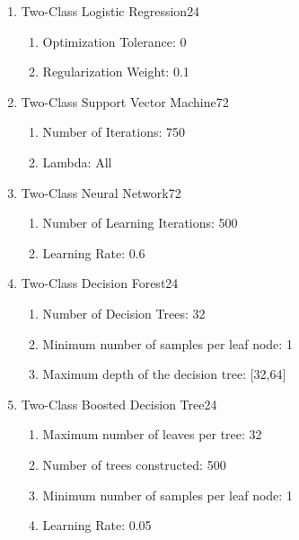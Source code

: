 \begin{enumerate}
    \item{Two-Class Logistic Regression}24
    
    \begin{enumerate}
        \item{Optimization Tolerance:} 0
        \item{Regularization Weight:} 0.1
    \end{enumerate}
    
    \item{Two-Class Support Vector Machine}72
    
    \begin{enumerate}
        \item{Number of Iterations:} 750
        \item{Lambda:} All
    \end{enumerate}
    
    \item{Two-Class Neural Network}72
    
    \begin{enumerate}
        \item{Number of Learning Iterations:} 500
        \item{Learning Rate:} 0.6
    \end{enumerate}
    
    \item{Two-Class Decision Forest}24

    \begin{enumerate}
        \item{Number of Decision Trees:} 32
        \item{Minimum number of samples per leaf node:} 1
        \item{Maximum depth of the decision tree:} [32,64]
    \end{enumerate}
    
    \item{Two-Class Boosted Decision Tree}24
    
    \begin{enumerate}
        \item{Maximum number of leaves per tree:} 32
        \item{Number of trees constructed:} 500
        \item{Minimum number of samples per leaf node:} 1
        \item{Learning Rate:} 0.05
    \end{enumerate}
    
\end{enumerate}


